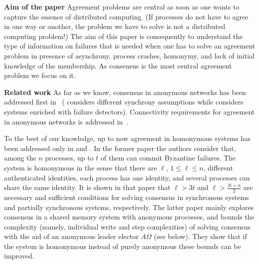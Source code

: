 \documentclass[10pt, conference, compsocconf]{IEEEtran}
\newcommand{\tightparagraph}[1]{\smallskip \noindent \textbf{#1} \hspace{1ex}}
\newcommand{\AO}{{A\Omega}}
\begin{document}
\tightparagraph{Aim of the paper}
Agreement problems are  central as soon as one wants  to capture the essence
of distributed computing. (If processes do not have to agree in one way
or another,  the problem we  have to solve  is not a  distributed computing
problem!)  
The  aim  of  this  paper   is  consequently  to  understand  the  type  of
information  on failures   that  is needed  when   one has    to solve   an
agreement  problem in  presence of asynchrony, process crashes,  
homonymy, and lack of initial knowledge of the membership. 
As consensus is the most central agreement problem we focus on it. 



\tightparagraph{Related work}
As far as we know, consensus in anonymous networks has been addressed 
first in~\cite{DBLP:conf/wdag/BonnetR09,DFT09} 
(\cite{DFT09} considers different synchrony assumptions while 
\cite{DBLP:conf/wdag/BonnetR09} considers systems enriched with
failure detectors). Connectivity requirements for agreement 
in anonymous networks is addressed in~\cite{GT07}. 


To the best of  our knowledge, up to now agreement  in  homonymous systems 
has been addressed  only  in \cite{DFGKRT11} and \cite{janus-opodis2011}.
In the former paper the  authors consider
that,  among the  $n$ processes,  up to  $t$ of  them can  commit Byzantine
failures.  The system is homonymous in the sense that there are $\ell$, 
$1 \leq \ell \leq n$,  different authenticated identities,  each process 
has one identity, and several processes can share the same identity. 
It is  shown in that paper that  $\ell >3t$  and  $\ell > \frac{3t+n}{2}$ 
are   necessary and sufficient conditions for solving consensus in synchronous 
systems and  partially synchronous systems, respectively.
The latter paper \cite{janus-opodis2011} mainly explores consensus
in a shared memory system with anonymous processes, and bounds
the complexity (namely, individual write and step complexities) of
solving consensus with the aid of an anonymous leader elector $\AO$ 
(see below).
They show that if the system is homonymous instead of purely anonymous
these bounds can be improved.
\end{document}
